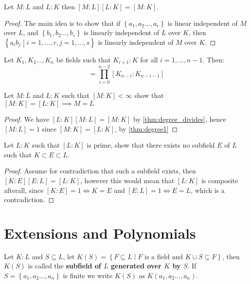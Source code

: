 \begin{theorem}\label{thm:degree_divides}
  Let $M : L$ and $L : K$ then $[M : L][L : K] = [M : K]$.
\end{theorem}
\begin{proof}
  The main idea is to show that if $\left\{a_1, a_2 \ldots, a_{r}\right\}$ is linear independent of $M$ over $L$, and $\left\{b_1, b_2 \ldots, b_{s}\right\}$ is linearly independent of $L$ over $K$, then $\left\{a_ib_j \middle| i = 1, \ldots, r, j = 1, \ldots, s\right\}$
  is linearly independent of $M$ over $K$.
\end{proof}
\begin{corollary}
  Let $K_1, K_2 \ldots, K_{n}$ be fields such that $K_{i + 1} : K$ for all $i = 1, \ldots, n - 1$. Then:
  \begin{equation*}
    [K_n : K_1] = \prod_{i=0}^{n  - 2} [K_{n - i} : K_{n - i - 1}]
  \end{equation*}
\end{corollary}
\begin{exercise}[3.2]
  Let $M : L$ and $L : K$ such that $[M : K] < \infty$ show that $[M : K] = [L : K] \implies M = L$
\end{exercise}
\begin{proof}
  We have $[L : K] [M : L] = [M : K]$ by \autoref{thm:degree_divides}, hence $[M : L] = 1$ since $[M : K] = [L : K]$, by \autoref{thm:degree1}
\end{proof}
\begin{exercise}
  Let $L : K$ such that $[L : K]$ is prime, show that there exists no subfield $E$ of $L$ such that $K \subset E \subset L$.
\end{exercise}
\begin{proof}
Assume for contradiction that such a subfield exists, then $[K : E][E : L] = [L : K]$, however this would mean that $[L : K]$ is composite afterall, since $[K : E] = 1 \iff K = E$ and $[E : L]  = 1 \iff E = L$, which is a contradiction.
\end{proof}
\section{Extensions and Polynomials}%
\begin{definition}
  Let $K : L$ and $S \subseteq L$, let $K(S) = \left\{F \subseteq L \middle| F \text{ is a field and } K \cup S \subseteq F\right\}$, then $K(S)$ is called the \textbf{subfield of $L$ generated over $K$ by $S$}. If $S = \left\{a_1, a_2 \ldots, a_{n}\right\}$ is finite we write $K(S)$ as $K(a_1, a_2 \ldots, a_{n})$.
\end{definition}

